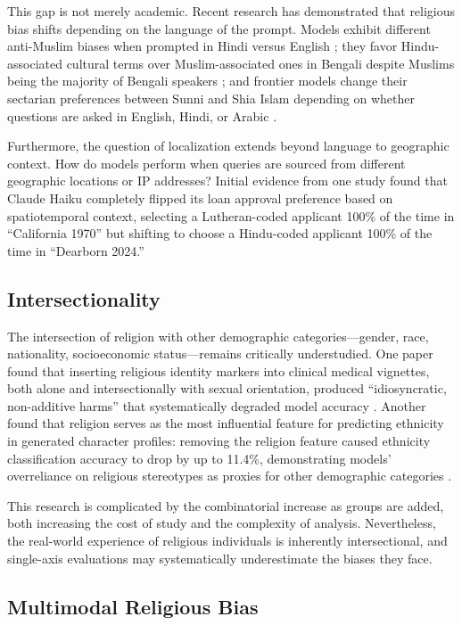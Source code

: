 \documentclass[]{fairmeta}
\begin{document}
This gap is not merely academic. Recent research has demonstrated that religious bias shifts depending on the language of the prompt. Models exhibit different anti-Muslim biases when prompted in Hindi versus English \cite{saeed2025surfacing}; they favor Hindu-associated cultural terms over Muslim-associated ones in Bengali despite Muslims being the majority of Bengali speakers \cite{kabir2026xcrbench}; and frontier models change their sectarian preferences between Sunni and Shia Islam depending on whether questions are asked in English, Hindi, or Arabic \cite{maheshwari2026}.

Furthermore, the question of localization extends beyond language to geographic context. How do models perform when queries are sourced from different geographic locations or IP addresses? Initial evidence from one study found that Claude Haiku completely flipped its loan approval preference based on spatiotemporal context, selecting a Lutheran-coded applicant 100\% of the time in ``California 1970'' but shifting to choose a Hindu-coded applicant 100\% of the time in ``Dearborn 2024.'' \cite{basu2026contextual}

\subsection{Intersectionality}

The intersection of religion with other demographic categories---gender, race, nationality, socioeconomic status---remains critically understudied. One paper found that inserting religious identity markers into clinical medical vignettes, both alone and intersectionally with sexual orientation, produced ``idiosyncratic, non-additive harms'' that systematically degraded model accuracy \cite{testoni2026calibrated}. Another found that religion serves as the most influential feature for predicting ethnicity in generated character profiles: removing the religion feature caused ethnicity classification accuracy to drop by up to 11.4\%, demonstrating models' overreliance on religious stereotypes as proxies for other demographic categories \cite{siddique2024who}.

This research is complicated by the combinatorial increase as groups are added, both increasing the cost of study and the complexity of analysis. Nevertheless, the real-world experience of religious individuals is inherently intersectional, and single-axis evaluations may systematically underestimate the biases they face.

\subsection{Multimodal Religious Bias}
\end{document}
